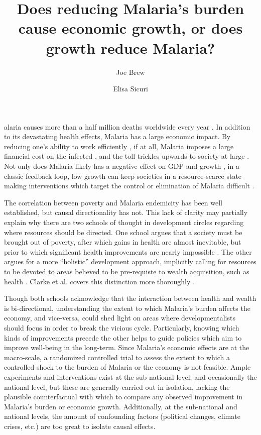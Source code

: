 \documentclass[9pt,twocolumn,twoside,lineno]{pnas-new}
\title{Does reducing Malaria's burden cause economic growth, or does growth reduce Malaria?}
\author[a,b,1]{Joe Brew}
\author[a,c]{Elisa Sicuri}
\affil[a]{Barcelona Institute for Global Health: c/ Rosselló, 132, 5è 2a. 08036, Barcelona, Catalonia}
\affil[b]{VU University Amsterdam: De Boelelaan 1105, 1081 HV Amsterdam, Netherlands}
\affil[c]{Imperial College London: South Kensington Campus, London SW7 2AZ, U.K., UK}
\begin{document}
\maketitle
\thispagestyle{firststyle}


alaria causes more than a half million deaths worldwide every year \cite{White}. In addition to its devastating health effects, Malaria has a large economic impact.  By reducing one’s ability to work efficiently \cite{Nonvignon2016-vt}, if at all, Malaria imposes a large financial cost on the infected \cite{Asenso-Okyere1997-wj} \cite{Ajani2010-dd}, and the toll trickles upwards to society at large \cite{Sachs2002-ig}. Not only does Malaria likely has a negative effect on GDP and growth \cite{McCarthy2000-wl, Orem2012-kr, Hong2011-sa, Sachs2002-ig}, in a classic feedback loop, low growth can keep societies in a resource-scarce state making interventions which target the control or elimination of Malaria difficult \cite{White, Purdy2013-rt, Howard2017-pk, Phillips1998-ky}. 

The correlation between poverty and Malaria endemicity has been well established, but causal directionality has not. This lack of clarity may partially explain why there are two schools of thought in development circles regarding where resources should be directed. One school argues that a society must be brought out of poverty, after which gains in health are almost inevitable, but prior to which significant health improvements are nearly impossible \cite{Musgrove1996-hm}.  The other argues for a more “holistic” development approach, implicitly calling for resources to be devoted to areas believed to be pre-requiste to wealth acquisition, such as health \cite{Storm2008-dd, Sen_undated-gp}.  Clarke et al. covers this distinction more thoroughly \cite{Clarke_JA2016-ik}.

Though both schools acknowledge that the interaction between health and wealth is bi-directional, understanding the extent to which Malaria’s burden affects the economy, and vice-versa, could shed light on areas where developmentalists should focus in order to break the vicious cycle. Particularly, knowing which kinds of improvements precede the other helps to guide policies which aim to improve well-being in the long-term. Since Malaria’s economic effects are at the macro-scale, a randomized controlled trial to assess the extent to which a controlled shock to the burden of Malaria or the economy is not feasible. Ample experiments and interventions exist at the sub-national level, and occasionally the national level, but these are generally carried out in isolation, lacking the plausible counterfactual with which to compare any observed improvement in Malaria’s burden or economic growth. Additionally, at the sub-national and national levels, the amount of confounding factors (political changes, climate crises, etc.) are too great to isolate causal effects. 
\end{document}
